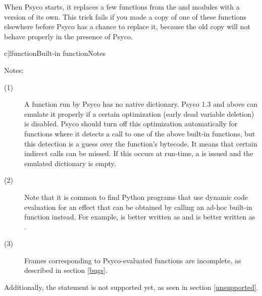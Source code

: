 \documentclass{manual}
\begin{document}
When Psyco starts, it replaces a few functions from the  and  modules with a version of its own.  This trick fails if you made a copy of one of these functions elsewhere before Psyco has a chance to replace it, because the old copy will not behave properly in the presence of Psyco.

%
\begin{tableii}{c|l}{function}{Built-in function}{Notes}
\end{tableii}

\noindent
Notes:
%
\begin{description}
\item[(1)]
  A function run by Psyco has no native  dictionary.  Psyco 1.3 and above can emulate it properly if a certain optimization (early dead variable deletion) is disabled.  Psyco should turn off this optimization automatically for functions where it detects a call to one of the above built-in functions, but this detection is a guess over the function's bytecode.  It means that certain indirect calls can be missed.  If this occurs at run-time, a  is issued and the emulated  dictionary is empty.
\item[(2)]
  Note that it is common to find Python programs that use dynamic code evaluation for an effect that can be obtained by calling an ad-hoc built-in function instead.  For example,  is better written as  and  is better written as .
\item[(3)]
  Frames corresponding to Psyco-evaluated functions are incomplete, as described in section \ref{bugs}.
\end{description}

Additionally, the  statement is not supported yet, as seen in section \ref{unsupported}.
\end{document}
